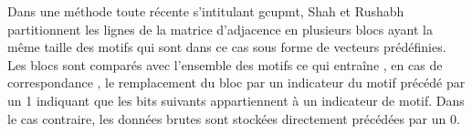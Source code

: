 
			Dans une méthode toute récente 
			s'intitulant \gls{gcupmt}, Shah et Rushabh \citep{shah2018graph}  partitionnent les lignes de la matrice d'adjacence en plusieurs blocs ayant la même taille des motifs qui sont dans ce cas sous forme de vecteurs prédéfinies. Les blocs sont comparés avec l'ensemble des motifs ce qui entraîne , en cas de correspondance , le remplacement du bloc par un indicateur du motif précédé par un 1 indiquant que les bits suivants appartiennent à un indicateur de motif. Dans le cas contraire, les données brutes sont stockées directement précédées par un 0.
				